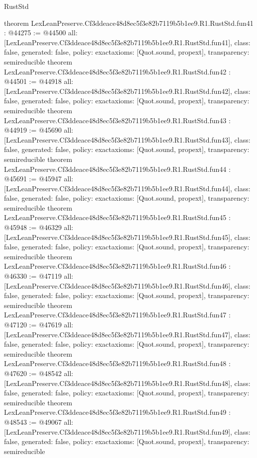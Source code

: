 \begin{lexlean}{RustStd}
\begin{coremodule}
{}
theorem LexLeanPreserve.Cf3ddeace48d8ec5f3e82b7119b5b1ee9.R1.RustStd.fun41 : @44275 := @44500 {
  all: [LexLeanPreserve.Cf3ddeace48d8ec5f3e82b7119b5b1ee9.R1.RustStd.fun41],
  class: false,
  generated: false,
  policy: exact{axioms: [Quot.sound, propext]},
  transparency: semireducible
}
theorem LexLeanPreserve.Cf3ddeace48d8ec5f3e82b7119b5b1ee9.R1.RustStd.fun42 : @44501 := @44918 {
  all: [LexLeanPreserve.Cf3ddeace48d8ec5f3e82b7119b5b1ee9.R1.RustStd.fun42],
  class: false,
  generated: false,
  policy: exact{axioms: [Quot.sound, propext]},
  transparency: semireducible
}
theorem LexLeanPreserve.Cf3ddeace48d8ec5f3e82b7119b5b1ee9.R1.RustStd.fun43 : @44919 := @45690 {
  all: [LexLeanPreserve.Cf3ddeace48d8ec5f3e82b7119b5b1ee9.R1.RustStd.fun43],
  class: false,
  generated: false,
  policy: exact{axioms: [Quot.sound, propext]},
  transparency: semireducible
}
theorem LexLeanPreserve.Cf3ddeace48d8ec5f3e82b7119b5b1ee9.R1.RustStd.fun44 : @45691 := @45947 {
  all: [LexLeanPreserve.Cf3ddeace48d8ec5f3e82b7119b5b1ee9.R1.RustStd.fun44],
  class: false,
  generated: false,
  policy: exact{axioms: [Quot.sound, propext]},
  transparency: semireducible
}
theorem LexLeanPreserve.Cf3ddeace48d8ec5f3e82b7119b5b1ee9.R1.RustStd.fun45 : @45948 := @46329 {
  all: [LexLeanPreserve.Cf3ddeace48d8ec5f3e82b7119b5b1ee9.R1.RustStd.fun45],
  class: false,
  generated: false,
  policy: exact{axioms: [Quot.sound, propext]},
  transparency: semireducible
}
theorem LexLeanPreserve.Cf3ddeace48d8ec5f3e82b7119b5b1ee9.R1.RustStd.fun46 : @46330 := @47119 {
  all: [LexLeanPreserve.Cf3ddeace48d8ec5f3e82b7119b5b1ee9.R1.RustStd.fun46],
  class: false,
  generated: false,
  policy: exact{axioms: [Quot.sound, propext]},
  transparency: semireducible
}
theorem LexLeanPreserve.Cf3ddeace48d8ec5f3e82b7119b5b1ee9.R1.RustStd.fun47 : @47120 := @47619 {
  all: [LexLeanPreserve.Cf3ddeace48d8ec5f3e82b7119b5b1ee9.R1.RustStd.fun47],
  class: false,
  generated: false,
  policy: exact{axioms: [Quot.sound, propext]},
  transparency: semireducible
}
theorem LexLeanPreserve.Cf3ddeace48d8ec5f3e82b7119b5b1ee9.R1.RustStd.fun48 : @47620 := @48542 {
  all: [LexLeanPreserve.Cf3ddeace48d8ec5f3e82b7119b5b1ee9.R1.RustStd.fun48],
  class: false,
  generated: false,
  policy: exact{axioms: [Quot.sound, propext]},
  transparency: semireducible
}
theorem LexLeanPreserve.Cf3ddeace48d8ec5f3e82b7119b5b1ee9.R1.RustStd.fun49 : @48543 := @49067 {
  all: [LexLeanPreserve.Cf3ddeace48d8ec5f3e82b7119b5b1ee9.R1.RustStd.fun49],
  class: false,
  generated: false,
  policy: exact{axioms: [Quot.sound, propext]},
  transparency: semireducible
}
\end{coremodule}
\end{lexlean}

